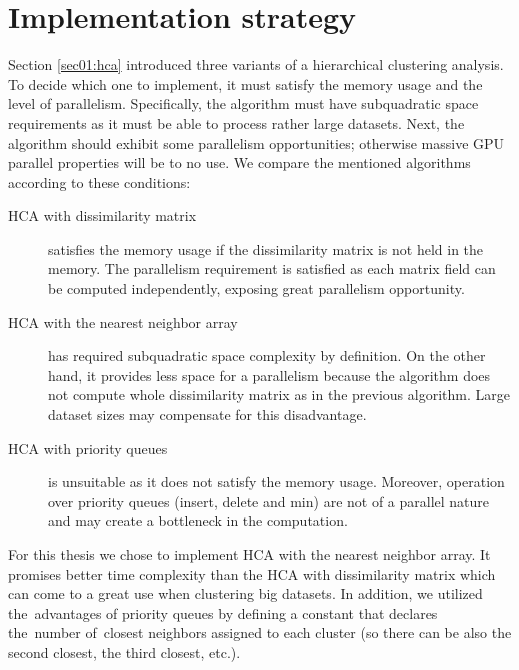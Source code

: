\section{Implementation strategy}

Section \ref{sec01:hca} introduced three variants of a hierarchical clustering analysis. To decide which one to implement, it must satisfy the memory usage and the level of parallelism. Specifically, the algorithm must have subquadratic space requirements as it must be able to process rather large datasets. Next, the algorithm should exhibit some parallelism opportunities; otherwise massive GPU parallel properties will be to no use.  We compare the mentioned algorithms according to these conditions:


\begin{description}

\item[HCA with dissimilarity matrix] satisfies the memory usage if the dissimilarity matrix is not held in the memory. The parallelism requirement is satisfied as each matrix field can be computed independently, exposing great parallelism opportunity. 

\item[HCA with the nearest neighbor array] has required subquadratic space complexity by definition. On the other hand, it provides less space for a parallelism because the algorithm does not compute whole dissimilarity matrix as in the previous algorithm. Large dataset sizes may compensate for this disadvantage. 

\item[HCA with priority queues] is unsuitable as it does not satisfy the memory usage. Moreover, operation over priority queues (insert, delete and min) are not of a parallel nature and may create a bottleneck in the computation.

\end{description}

For this thesis we chose to implement HCA with the nearest neighbor array. It promises better time complexity than the HCA with dissimilarity matrix which can come to a great use when clustering big datasets. In addition, we utilized the~advantages of priority queues by defining a constant that declares the~number of~closest neighbors assigned to each cluster (so there can be also the second closest, the third closest, etc.).


